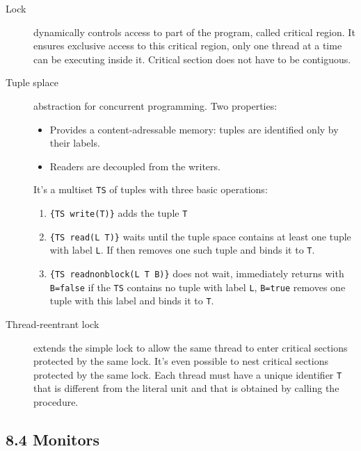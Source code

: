 \begin{description}

  \item[Lock] dynamically controls access to part of the program, called critical region.
    It ensures exclusive access to this critical region, only one thread at a time can be executing inside it.
    Critical section does not have to be contiguous.
  \item[Tuple splace] abstraction for concurrent programming.
    Two properties:
    \begin{itemize}
      \item Provides a content-adressable memory: tuples are identified only by their labels.
      \item Readers are decoupled from the writers.
    \end{itemize}

    It's a multiset \lstinline|TS| of tuples with three basic operations:
    \begin{enumerate}
      \item \lstinline|{TS write(T)}| adds the tuple \lstinline|T|
      \item \lstinline|{TS read(L T)}| waits until the tuple space contains at least one tuple with label \lstinline|L|.
        If then removes one such tuple and binds it to \lstinline|T|.
      \item \lstinline|{TS readnonblock(L T B)}| does not wait, immediately returns with
        \lstinline|B=false| if the \lstinline|TS| contains no tuple with label \lstinline|L|,
        \lstinline|B=true| removes one tuple with this label and binds it to \lstinline|T|.
    \end{enumerate}

  \item[Thread-reentrant lock] extends the simple lock to allow the same thread to enter critical sections protected by the same lock.
    It's even possible to nest critical sections protected by the same lock.
    Each thread must have a unique identifier \lstinline|T| that is different from the literal unit and that is obtained by calling the procedure.
\end{description}

\subsection{8.4 Monitors}

